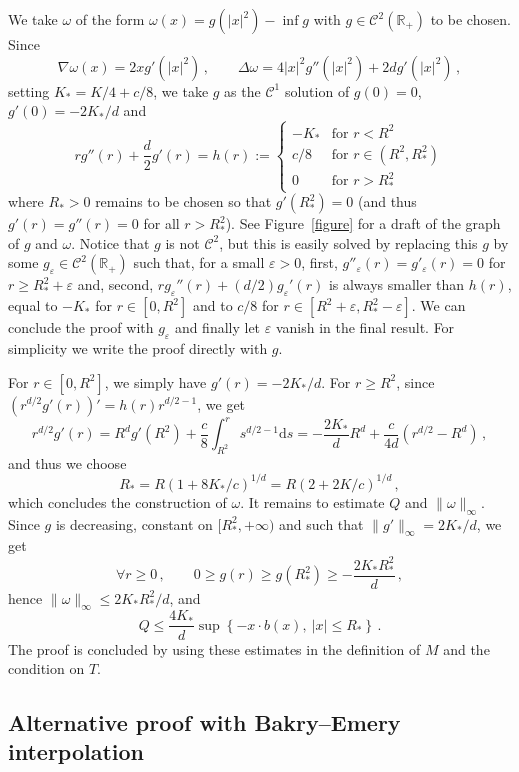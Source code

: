 \documentclass[10pt]{amsart}
\theoremstyle{definition}\newtheorem{defi}[theo]{Definition}\newtheorem{rema}[theo]{Remark}\newtheorem{exam}[theo]{Example}\newtheorem{exem}[theo]{Example}\newtheorem{nota}[theo]{Notation}
\newcommand{\R}{\mathbb R}
\newcommand{\clC}{\mathcal C}
\newcommand{\dd}{\mathrm{d}}
\newcommand{\na}{\nabla}
\newcommand{\1}{\mathbbm{1}}
\newcommand{\nv}[1]{#1}
\let\oldforall\forall
\renewcommand*{\forall}{\mathrel{\oldforall}}
\begin{document}
We take $\nv{\omega}$ of the form $\nv{\omega}(x) = g(|x|^2)-\inf g$ with $g\in\clC^2(\R_+)$ to be chosen. Since
\[
\na\nv{\omega}(x) = 2xg'(|x|^2) \,,\qquad \Delta \nv{\omega} = 4|x|^2 g''(|x|^2) + 2dg'(|x|^2)\,,
\]
setting $K_* = K/4+c/8$, we take $g$ as the $\clC^1$ solution of $g(0)=0$, $g'(0)=-2K_*/d$ and
\[
r g''(r) + \frac{d}2 g'(r) = h(r):= \left\{
\begin{array}{ll}
-K_* & \text{for }r<R^2\\
c/8 & \text{for }r\in\left(R^2,R_*^2\right)\\
0 & \text{for }r>R_*^2
\end{array}\right.
\]
where $R_*>0$ remains to be chosen so that $g'(R_*^2)=0$ (and thus $g'(r)=g''(r)=0$ for all $r> R_*^2$). See Figure~\ref{figure} for a draft of the graph of $g$ and $\omega$. Notice that $g$ is not $\clC^2$, but this is easily solved by replacing this $g$ by some $g_\varepsilon \in\clC^2(\R_+)$ such that, for a small $\varepsilon>0$, first, $g''_\varepsilon(r)=g'_\varepsilon(r)=0$ for $r\geqslant R_*^2 + \varepsilon$ and, second, $r g_\varepsilon''(r) + \nv{(d/2)} g_\varepsilon'(r)$ is always smaller than $h(r)$, equal to $ -K_*$ for $r\in[0,R^2]$ and to $c/8$ for $r\in[R^2+\varepsilon,R_*^2-\varepsilon]$. We can conclude the proof with $g_\varepsilon$ and finally let $\varepsilon$ vanish in the final result. For simplicity we write the proof directly with $g$.

For $r\in[0,R^2]$, we simply have $g'(r) = -2K_*/d$. For $r\geqslant R^2$, since $(r^{d/2} g'(r))' = h(r) r^{d/2-1}$, we get
\[
r^{d/2} g'(r) = R^{d} g'(R^2) + \frac c8\int_{R^2}^r s^{d/2-1}\dd s = -\frac{2K_*}{d}R^{d} + \frac{c}{4d}\left( r^{d/2} - R^{d}\right) \,,
\]
and thus we choose
\[
R_* = R \left( 1+ 8K_*/c\right)^{1/d} = R\left( 2+2K/c\right)^{1/d}\,,
\]
which concludes the construction of $\nv{\omega}$. It remains to estimate $Q$ and $\|\nv{\omega}\|_\infty$. Since $g$ is decreasing, constant on $[R_*^2,+\infty)$ and such that $\|g'\|_\infty =2K_*/d$, we get
\[
\forall r\geqslant0\,,\qquad 0 \geqslant g(r) \geqslant g(R_*^2) \geqslant -\frac{2K_*R_*^2}{d}\,,
\]
hence $\|\nv{\omega}\|_\infty \leqslant 2K_* R_*^2/d$, and
\[
Q \leqslant \frac{4K_*}{d} \sup\left\{-x\cdot b(x),\ |x|\leqslant R_*\right\}\,.
\]
The proof is concluded by using these estimates in the definition of $M$ and the condition on $T$.

\subsection{Alternative proof with Bakry--Emery interpolation}\label{Sec:preuveAlternative}
\end{document}

